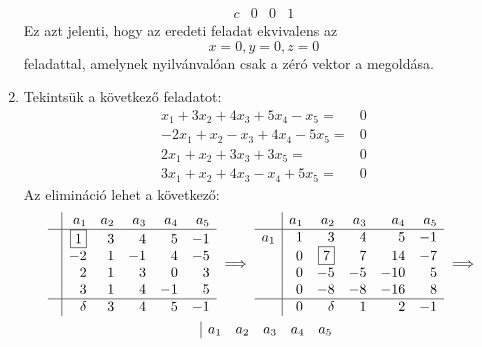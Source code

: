 \documentclass[a4paper, showtrims]{memoir}
\theoremstyle{plain}
\theoremstyle{remark}
\theoremstyle{definition}
\begin{document}
\begin{enumerate}
\[\begin{array}{r|rrr}
      c & 0 & 0 & 1
      \end{array}
      \]
      Ez azt jelenti, hogy az eredeti feladat ekvivalens az
      \[x=0,y=0,z=0\]
	  feladattal, amelynek nyilvánvalóan csak a zéró vektor a megoldása.
	\item
	      Tekintsük a következő feladatot:
	      \[
		      \begin{array}{rl}
			      x_1+3x_2+4x_3+5x_4-x_5=  & 0 \\
			      -2x_1+x_2-x_3+4x_4-5x_5= & 0 \\
			      2x_1+x_2+3x_3+3x_5=      & 0 \\
			      3x_1+x_2+4x_3-x_4+5x_5=  & 0
		      \end{array}
	      \]
	      Az elimináció lehet a következő:
	      \begin{multline*}
		      \begin{array}{r|rrrrr}
			       & a_1       & a_2 & a_3 & a_4 & a_5 \\
			      \hline
			       & \boxed{1} & 3   & 4   & 5   & -1  \\
			       & -2        & 1   & -1  & 4   & -5  \\
			       & 2         & 1   & 3   & 0   & 3   \\
			       & 3         & 1   & 4   & -1  & 5   \\
			      \hline
			       & \delta    & 3   & 4   & 5   & -1
		      \end{array}
		      \implies
		      \begin{array}{r|rrrrr}
			          & a_1 & a_2       & a_3 & a_4 & a_5 \\
			      \hline
			      a_1 & 1   & 3         & 4   & 5   & -1  \\
			          & 0   & \boxed{7} & 7   & 14  & -7  \\
			          & 0   & -5        & -5  & -10 & 5   \\
			          & 0   & -8        & -8  & -16 & 8   \\
			      \hline
			          & 0   & \delta    & 1   & 2   & -1
		      \end{array}
		      \implies
		      \\
		      \begin{array}{r|rrrrr}
			          & a_1 & a_2 & a_3 & a_4 & a_5 \\

\end{array}
\end{multline*}
\end{enumerate}
\end{document}

